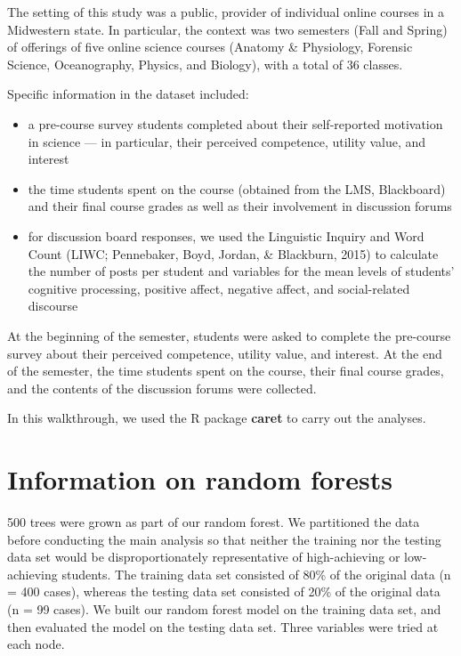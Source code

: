 \documentclass[]{book}
\providecommand{\tightlist}{%
  \setlength{\itemsep}{0pt}\setlength{\parskip}{0pt}}
\begin{document}
The setting of this study was a public, provider of individual online
courses in a Midwestern state. In particular, the context was two
semesters (Fall and Spring) of offerings of five online science courses
(Anatomy \& Physiology, Forensic Science, Oceanography, Physics, and
Biology), with a total of 36 classes.

Specific information in the dataset included:

\begin{itemize}
\tightlist
\item
  a pre-course survey students completed about their self-reported
  motivation in science --- in particular, their perceived competence,
  utility value, and interest
\item
  the time students spent on the course (obtained from the LMS,
  Blackboard) and their final course grades as well as their involvement
  in discussion forums
\item
  for discussion board responses, we used the Linguistic Inquiry and
  Word Count (LIWC; Pennebaker, Boyd, Jordan, \& Blackburn, 2015) to
  calculate the number of posts per student and variables for the mean
  levels of students' cognitive processing, positive affect, negative
  affect, and social-related discourse
\end{itemize}

At the beginning of the semester, students were asked to complete the
pre-course survey about their perceived competence, utility value, and
interest. At the end of the semester, the time students spent on the
course, their final course grades, and the contents of the discussion
forums were collected.

In this walkthrough, we used the R package \textbf{caret} to carry out
the analyses.

\chapter{Information on random
forests}\label{information-on-random-forests}

500 trees were grown as part of our random forest. We partitioned the
data before conducting the main analysis so that neither the training
nor the testing data set would be disproportionately representative of
high-achieving or low-achieving students. The training data set
consisted of 80\% of the original data (n = 400 cases), whereas the
testing data set consisted of 20\% of the original data (n = 99 cases).
We built our random forest model on the training data set, and then
evaluated the model on the testing data set. Three variables were tried
at each node.
\end{document}
